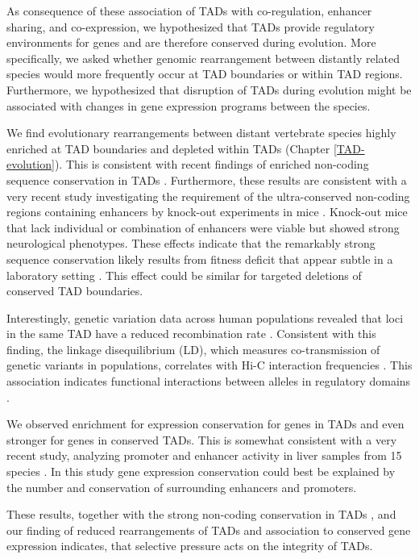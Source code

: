 \documentclass[a4paper,twoside=true,openright,parskip=full,chapterprefix=true,11pt,headings=normal,bibliography=totoc,listof=totoc,titlepage=on,captions=tableabove,draft=false]{scrreprt}
\theoremstyle{definition}
\theoremstyle{definition}
\theoremstyle{definition}
\theoremstyle{remark}
\begin{document}
As consequence of these association of TADs with co-regulation, enhancer
sharing, and co-expression, we hypothesized that TADs provide regulatory
environments for genes and are therefore conserved during evolution.
More specifically, we asked whether genomic rearrangement between
distantly related species would more frequently occur at TAD boundaries
or within TAD regions. Furthermore, we hypothesized that disruption of
TADs during evolution might be associated with changes in gene
expression programs between the species.

We find evolutionary rearrangements between distant vertebrate species
highly enriched at TAD boundaries and depleted within TADs (Chapter
\ref{TAD-evolution}). This is consistent with recent findings of
enriched non-coding sequence conservation in TADs
\citep{Harmston2017, Polychronopoulos2017}. Furthermore, these results
are consistent with a very recent study investigating the requirement of
the ultra-conserved non-coding regions containing enhancers by knock-out
experiments in mice \citep{Dickel2018}. Knock-out mice that lack
individual or combination of enhancers were viable but showed strong
neurological phenotypes. These effects indicate that the remarkably
strong sequence conservation likely results from fitness deficit that
appear subtle in a laboratory setting \citep{Dickel2018}. This effect
could be similar for targeted deletions of conserved TAD boundaries.

Interestingly, genetic variation data across human populations revealed
that loci in the same TAD have a reduced recombination rate
\citep{Liu2016b}. Consistent with this finding, the linkage
disequilibrium (LD), which measures co-transmission of genetic variants
in populations, correlates with Hi-C interaction frequencies
\citep{Gerber2018}. This association indicates functional interactions
between alleles in regulatory domains \citep{Liu2016b}.

We observed enrichment for expression conservation for genes in TADs and
even stronger for genes in conserved TADs. This is somewhat consistent
with a very recent study, analyzing promoter and enhancer activity in
liver samples from 15 species \citep{Berthelot2017}. In this study gene
expression conservation could best be explained by the number and
conservation of surrounding enhancers and promoters.

These results, together with the strong non-coding conservation in TADs
\citep{Harmston2017}, and our finding of reduced rearrangements of TADs
and association to conserved gene expression indicates, that selective
pressure acts on the integrity of TADs.
\end{document}

